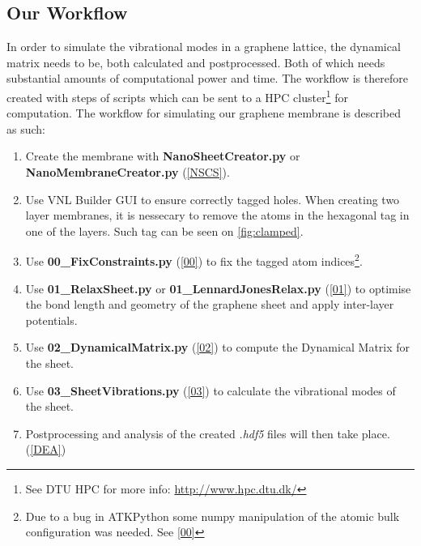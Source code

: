
\subsection{Our Workflow}
In order to simulate the vibrational modes in a graphene lattice, the dynamical matrix needs to be, both calculated and postprocessed. Both of which needs substantial amounts of computational power and time. The workflow is therefore created with steps of scripts which can be sent to a HPC cluster\footnote{See DTU HPC for more info: \url{http://www.hpc.dtu.dk/}} for computation.
The workflow for simulating our graphene membrane is described as such:
\begin{enumerate}
  \item Create the membrane with \textbf{NanoSheetCreator.py} or \textbf{NanoMembraneCreator.py} (\cref{NSCS}).
  \item Use VNL Builder GUI to ensure correctly tagged holes. When creating two layer membranes, it is nessecary to remove the atoms in the hexagonal tag in one of the layers. Such tag can be seen on \cref{fig:clamped}.
  \item Use \textbf{00\_FixConstraints.py} (\cref{00}) to fix the tagged atom indices\footnote{Due to a bug in ATKPython some numpy manipulation of the atomic bulk configuration was needed. See \cref{00}}.
  \item Use \textbf{01\_RelaxSheet.py} or \textbf{01\_LennardJonesRelax.py} (\cref{01}) to optimise the bond length and geometry of the graphene sheet and apply inter-layer potentials.
  \item Use \textbf{02\_DynamicalMatrix.py} (\cref{02}) to compute the Dynamical Matrix for the sheet.
  \item Use \textbf{03\_SheetVibrations.py} (\cref{03}) to calculate the vibrational modes of the sheet.
  \item Postprocessing and analysis of the created \textit{.hdf5} files will then take place. (\cref{DEA})
\end{enumerate}

